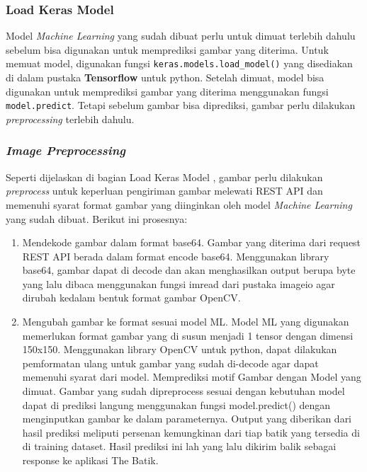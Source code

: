     \subsubsection{Load Keras Model}
    \label{loadKeras}
    Model \textit{Machine Learning} yang sudah dibuat perlu untuk dimuat terlebih dahulu sebelum bisa digunakan untuk memprediksi gambar yang diterima.
    Untuk memuat model, digunakan fungsi \lstinline{keras.models.load_model()} yang disediakan di dalam pustaka \textbf{Tensorflow} untuk python.
    Setelah dimuat, model bisa digunakan untuk memprediksi gambar yang diterima menggunakan fungsi \lstinline{model.predict}.
    Tetapi sebelum gambar bisa diprediksi, gambar perlu dilakukan \textit{preprocessing} terlebih dahulu.

    \subsubsection{\textit{Image Preprocessing}}

    Seperti dijelaskan di bagian Load Keras Model , gambar perlu dilakukan \textit{preprocess} untuk keperluan pengiriman gambar melewati REST API dan memenuhi syarat format gambar yang diinginkan oleh model \textit{Machine Learning} yang sudah dibuat.
    Berikut ini prosesnya:

      \begin{enumerate}[nolistsep]

        \item Mendekode gambar dalam format base64.
        Gambar yang diterima dari request REST API berada dalam format encode base64.
        Menggunakan library base64, gambar dapat di decode dan akan menghasilkan output berupa byte yang lalu dibaca menggunakan fungsi imread dari pustaka imageio agar dirubah kedalam bentuk format gambar OpenCV.

        \item Mengubah gambar ke format sesuai model ML.
        Model ML yang digunakan memerlukan format gambar yang di susun menjadi 1 tensor dengan dimensi 150x150.
        Menggunakan library OpenCV untuk python, dapat dilakukan pemformatan ulang untuk gambar yang sudah di-decode agar dapat memenuhi syarat dari model. 
        Memprediksi motif Gambar dengan Model yang dimuat.
        Gambar yang sudah dipreprocess sesuai dengan kebutuhan model dapat di prediksi langung menggunakan fungsi model.predict() dengan menginputkan gambar ke dalam parameternya. Output yang diberikan dari hasil prediksi meliputi persenan kemungkinan dari tiap batik yang tersedia di di training dataset. 
        Hasil prediksi ini lah yang lalu dikirim balik sebagai response ke aplikasi The Batik.

      \end{enumerate}
    
